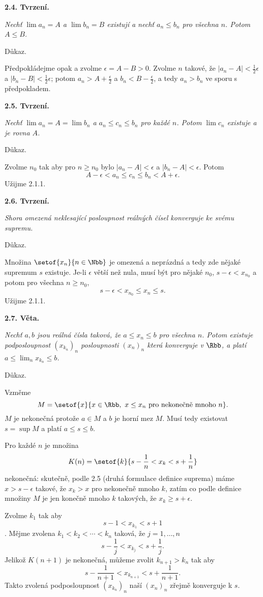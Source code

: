 \documentclass[12pt]{article}
\begin{document}
 \bigskip
 
 {\bf 2.4. Tvrzení.} {\em Nechť $\lim a_n=A$ a $\lim b_n=B$ existují a nechť $a_n\leq b_n$ pro všechna $n$.
 Potom $A\leq B$.
 
 Důkaz.} Předpokládejme opak a zvolme $\epsilon=A-B>0$. Zvolme $n$ takové, že $|a_n-A|<\frac12\epsilon$
 a $|b_n-B|<\frac12\epsilon$; potom $a_n>A+\frac{\epsilon}2$ a $b_n<B-\frac{\epsilon}2$, a tedy $a_n>b_n$ ve sporu s předpokladem.\sq
 
 \bigskip
 
 {\bf 2.5. Tvrzení.} {\em Nechť $\lim a_n=A=\lim b_n$  a $a_n\leq c_n\leq b_n$ pro každé $n$.
 Potom $\lim c_n$ existuje a je rovna $A$.
 
 Důkaz.} Zvolme $n_0$ tak aby pro $n\geq n_0$ bylo $|a_n-A|<\epsilon$ a $|b_n-A|<\epsilon$. Potom
 $$
 A-\epsilon<a_n\leq c_n\leq b_n<A+\epsilon.
 $$
 Užijme 2.1.1. \sq
 
 \bigskip
 
 {\bf 2.6. Tvrzení.} {\em Shora omezená neklesající posloupnost reálných čísel konverguje ke svému supremu.

 Důkaz.} Množina $\setof{x_n}{n\in\Nbb}$ je omezená a neprázdná a tedy zde  nějaké supremum $s$ existuje. Je-li $\epsilon$ větší než nula, musí být pro nějaké $n_0$,  $s-\epsilon<x_{n_0}$ a potom pro všechna $n\geq n_0$,
 $$
 s-\epsilon<x_{n_0}\leq x_n\leq s.
 $$
 Užijme 2.1.1. \sq
 
 \bigskip
 
 {\bf 2.7. Věta.} {\em Nechť $a,b$ jsou reálná čísla taková, že $a\leq x_n\leq b$ pro všechna $n$. Potom existuje podposloupnost $(x_{k_n})_n$ posloupnosti $(x_n)_n$ která konverguje v $\Rbb$, a platí $a\leq \lim_nx_{k_n}\leq b$.
 
 Důkaz.} Vzměme
 $$
 M=\setof{x}{x\in\Rbb,\ x\leq x_n\ \text{pro nekonečně mnoho}\ n}.
 $$
 $M$ je nekonečná protože $a\in M$ a $b$ je horní mez $M$. Musí tedy existovat
 $
 s=\sup M$ a platí $a\leq s\leq b
 $.
 
Pro každé $n$ je množina
 $$
 K(n)=\setof{k}{s-\frac1n<x_k<s+\frac1n}
 $$
nekonečná: skutečně, podle 2.5 (druhá formulace definice suprema) máme $x>s-\epsilon$ takové, že $x_k> x$ pro nekonečně mnoho $k$, zatím co podle definice množiny $M$ je jen konečně mnoho $k$ takových, že
 $x_k\geq s+\epsilon$.
 
 Zvolme $k_1$ tak aby
 $$
  s-1 < x_{k_1}< s+1
  $$.
 Mějme zvolena $k_1< k_2<\cdots< k_n$ taková, že $j=1,\dots,n$
  $$
  s-\frac1j < x_{k_j}< s+\frac1j.
  $$
 Jelikož $K(n+1)$ je nekonečná, můžeme zvolit $k_{n+1}> k_n$ tak aby
  $$
  s-\frac1{n+1} < x_{k_{n+1}}< s+\frac1{n+1}.
  $$
  Takto zvolená podposloupnost $(x_{k_n})_n$ naší $(x_n)_n$ zřejmě konverguje k $s$. \sq
 
\end{document}
